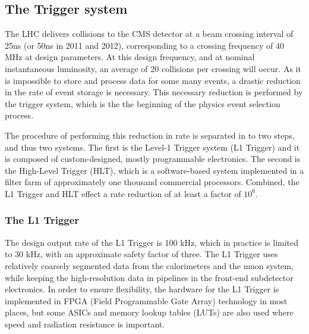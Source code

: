 \subsection{The Trigger system}
\label{trigger}


The LHC delivers collisions to the CMS detector at a beam crossing interval of 25ns (or 50ns in 2011 and 2012), corresponding to a crossing frequency of 40 MHz at design parameters.  At this design frequency, and at nominal instantaneous luminosity, an average of 20 collisions per crossing will occur.  As it is impossible to store and process data for some many events, a drastic reduction in the rate of event storage is necessary.  This necessary reduction is performed by the trigger system, which is the the beginning of the physics event selection process.  

The procedure of performing this reduction in rate is separated in to two steps, and thus two systems.  The first is the Level-1 Trigger system (L1 Trigger) and it is composed of custom-designed, mostly programmable electronics.  The second is the High-Level Trigger (HLT), which is a software-based system implemented in a filter farm of approximately one thousand commercial processors.  Combined, the L1 Trigger and HLT effect a rate reduction of at least a factor of $10^6$.  



\subsubsection{The L1 Trigger}
\label{l1trigger}

The design output rate of the L1 Trigger is 100 kHz, which in practice is limited to 30 kHz, with an approximate safety factor of three.  The L1 Trigger uses relatively coarsely segmented data from the calorimeters and the muon system, while keeping the high-resolution data in pipelines in the front-end subdetector electronics.  In order to ensure flexibility, the hardware for the L1 Trigger is implemented in FPGA (Field Programmable Gate Array) technology in most places, but some ASICs and memory lookup tables (LUTs) are also used where speed and radiation resistance is important.  

